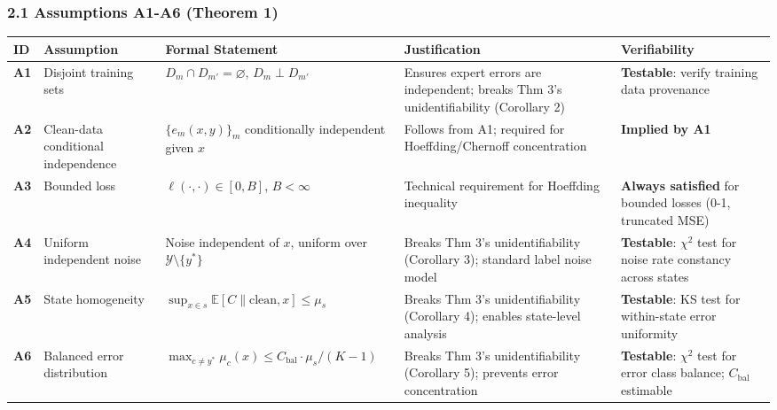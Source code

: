 \documentclass[
  12pt,
]{ctexart}
\begin{document}
\subsubsection{2.1 Assumptions A1-A6 (Theorem
1)}\label{assumptions-a1-a6-theorem-1}

\begin{longtable}[]{@{}
  >{\raggedright\arraybackslash}p{}
  >{\raggedright\arraybackslash}p{}
  >{\raggedright\arraybackslash}p{}
  >{\raggedright\arraybackslash}p{}
  >{\raggedright\arraybackslash}p{}@{}}
\toprule\noalign{}
\begin{minipage}[b]{\linewidth}\raggedright
ID
\end{minipage} & \begin{minipage}[b]{\linewidth}\raggedright
Assumption
\end{minipage} & \begin{minipage}[b]{\linewidth}\raggedright
Formal Statement
\end{minipage} & \begin{minipage}[b]{\linewidth}\raggedright
Justification
\end{minipage} & \begin{minipage}[b]{\linewidth}\raggedright
Verifiability
\end{minipage} \\
\midrule\noalign{}
\endhead
\bottomrule\noalign{}
\endlastfoot
\textbf{A1} & Disjoint training sets &
\(D_m \cap D_{m'} = \varnothing\), \(D_m \perp D_{m'}\) & Ensures expert
errors are independent; breaks Thm 3's unidentifiability (Corollary 2) &
\textbf{Testable}: verify training data provenance \\
\textbf{A2} & Clean-data conditional independence & \(\{e_m(x,y)\}_m\)
conditionally independent given \(x\) & Follows from A1; required for
Hoeffding/Chernoff concentration & \textbf{Implied by A1} \\
\textbf{A3} & Bounded loss & \(\ell(\cdot,\cdot) \in [0,B]\),
\(B < \infty\) & Technical requirement for Hoeffding inequality &
\textbf{Always satisfied} for bounded losses (0-1, truncated MSE) \\
\textbf{A4} & Uniform independent noise & Noise independent of \(x\),
uniform over \(\mathcal{Y}\setminus\{y^*\}\) & Breaks Thm 3's
unidentifiability (Corollary 3); standard label noise model &
\textbf{Testable}: \(\chi^2\) test for noise rate constancy across
states \\
\textbf{A5} & State homogeneity &
\(\sup_{x\in s} \mathbb{E}[C\|\text{clean},x] \leq \mu_s\) & Breaks Thm
3's unidentifiability (Corollary 4); enables state-level analysis &
\textbf{Testable}: KS test for within-state error uniformity \\
\textbf{A6} & Balanced error distribution &
\(\max_{c\neq y^*}\mu_c(x) \leq C_{\text{bal}} \cdot \mu_s/(K-1)\) &
Breaks Thm 3's unidentifiability (Corollary 5); prevents error
concentration & \textbf{Testable}: \(\chi^2\) test for error class
balance; \(C_{\text{bal}}\) estimable \\
\end{longtable}
\end{document}
